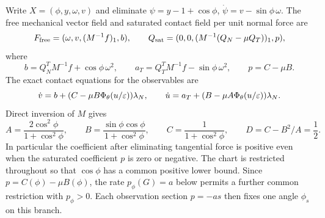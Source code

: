 Write $X=(\phi,y,\omega,v)$ and eliminate
$\psi=y-1+\cos\phi$, $\dot\psi=v-\sin\phi\,\omega$.
The free mechanical vector field and saturated contact field per unit
normal force are
\begin{equation}
 F_{\rm free}=(\omega,v,(M^{-1}f)_1,b),\qquad
 Q_{\rm sat}=(0,0,(M^{-1}(Q_N-\mu Q_T))_1,p),
 \label{eq:bd-fields}
\end{equation}
where
\begin{equation}
 b=Q_N^TM^{-1}f+\cos\phi\,\omega^2,\qquad
 a_T=Q_T^TM^{-1}f-\sin\phi\,\omega^2,
 \qquad p=C-\mu B.
 \label{eq:bd-free-accelerations}
\end{equation}
The exact contact equations for the observables are
\begin{equation}
 \dot v=b+(C-\mu B\Phi_\theta(u/\varepsilon))\lambda_N,
 \qquad
 \dot u=a_T+(B-\mu A\Phi_\theta(u/\varepsilon))\lambda_N.
 \label{eq:bd-contact-accelerations}
\end{equation}
Direct inversion of $M$ gives
\begin{equation}
 A=\frac{2\cos^2\phi}{1+\cos^2\phi},\qquad
 B=\frac{\sin\phi\cos\phi}{1+\cos^2\phi},\qquad
 C=\frac1{1+\cos^2\phi},\qquad
 D=C-B^2/A=\frac12.
 \label{eq:bd-delassus}
\end{equation}
In particular the coefficient after eliminating tangential force is
positive even when the saturated coefficient $p$ is zero or negative.
The chart is restricted throughout so that $\cos\phi$ has a common
positive lower bound.
Since $p=C(\phi)-\mu B(\phi)$, the rate
$p_\phi(G)=a$ below permits a further common restriction with
$p_\phi>0$. Each observation section $p=-as$ then fixes one angle
$\phi_s$ on this branch.

